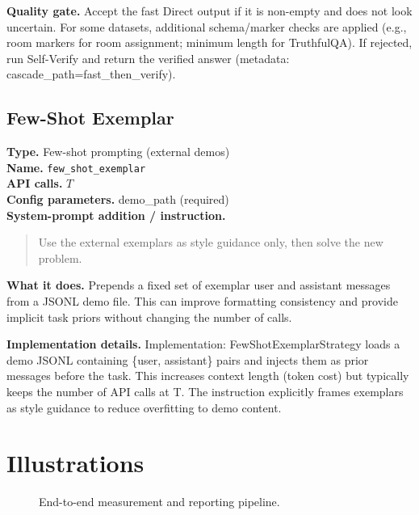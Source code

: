 \documentclass[10pt,twocolumn]{article}
\begin{document}
\noindent\textbf{Quality gate.} Accept the fast Direct output if it is non-empty and does not look uncertain. For some datasets, additional schema/marker checks are applied (e.g., room markers for room assignment; minimum length for TruthfulQA). If rejected, run Self-Verify and return the verified answer (metadata: cascade\_path=fast\_then\_verify).

\subsection*{Few-Shot Exemplar}
\noindent\textbf{Type.} Few-shot prompting (external demos)\\
\textbf{Name.} \texttt{few\_\hspace{0pt}shot\_\hspace{0pt}exemplar}\\
\textbf{API calls.} $T$\\
\textbf{Config parameters.} demo\_path (required)\\

\noindent\textbf{System-prompt addition / instruction.}
\begin{quote}\footnotesize
Use the external exemplars as style guidance only, then solve the new problem.
\end{quote}
\noindent\textbf{What it does.} Prepends a fixed set of exemplar user and assistant messages from a JSONL demo file. This can improve formatting consistency and provide implicit task priors without changing the number of calls.

\noindent\textbf{Implementation details.} Implementation: FewShotExemplarStrategy loads a demo JSONL containing \{user, assistant\} pairs and injects them as prior messages before the task. This increases context length (token cost) but typically keeps the number of API calls at T. The instruction explicitly frames exemplars as style guidance to reduce overfitting to demo content.

\section*{Illustrations}
\begin{figure}[t]
\centering
{}
\caption{End-to-end measurement and reporting pipeline.}
\label{fig:pipeline}
\end{figure}
\end{document}
